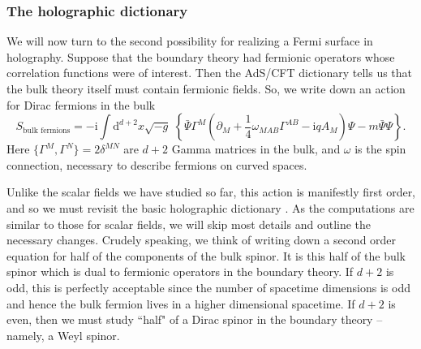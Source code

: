 \documentclass[10pt, oneside]{book}
\begin{document}
\begin{doublespace}
\subsubsection{The holographic dictionary}
We will now turn to the second possibility for realizing a Fermi surface in holography.   Suppose that the boundary theory had fermionic operators whose correlation functions were of interest.   Then the AdS/CFT dictionary tells us that the bulk theory itself must contain fermionic fields.    So, we write down an action for Dirac fermions in the bulk \begin{equation}
S_{\text{bulk fermions}} = -\mathrm{i}\int \mathrm{d}^{d+2}x\sqrt{-g} \; \left\lbrace\bar\Psi \Gamma^M \left(\partial_M + \frac{1}{4} \omega_{M AB}\Gamma^{AB} - \mathrm{i}qA_M\right) \Psi - m \bar\Psi \Psi \right\rbrace.  \label{eq:fermionaction}
\end{equation}
Here $\lbrace \Gamma^M, \Gamma^N\rbrace = 2\delta^{MN}$ are $d+2$ Gamma matrices in the bulk, and $\omega$ is the spin connection, necessary to describe fermions on curved spaces.  

Unlike the scalar fields we have studied so far, this action is manifestly first order, and so we must revisit the basic holographic dictionary \cite{Mueck:1998iz}.   As the computations are similar to those for scalar fields, we will skip most details and outline the necessary changes.   Crudely speaking, we think of writing down a second order equation for half of the components of the bulk spinor.  It is this half of the bulk spinor which is dual to fermionic operators in the boundary theory.  If $d+2$ is odd, this is perfectly acceptable since the number of spacetime dimensions is odd and hence the bulk fermion lives in a higher dimensional spacetime.   If $d+2$ is even,  then we must study ``half" of a Dirac spinor in the boundary theory -- namely, a Weyl spinor.   


\end{doublespace}
\end{document}
